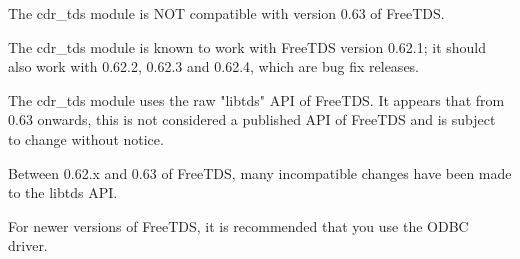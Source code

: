 The cdr\_tds module is NOT compatible with version 0.63 of FreeTDS.

The cdr\_tds module is known to work with FreeTDS version 0.62.1;
it should also work with 0.62.2, 0.62.3 and 0.62.4, which are bug
fix releases.

The cdr\_tds module uses the raw "libtds" API of FreeTDS. It appears
that from 0.63 onwards, this is not considered a published API
of FreeTDS and is subject to change without notice.

Between 0.62.x and 0.63 of FreeTDS, many incompatible changes
have been made to the libtds API.

For newer versions of FreeTDS, it is recommended that you use the
ODBC driver.


